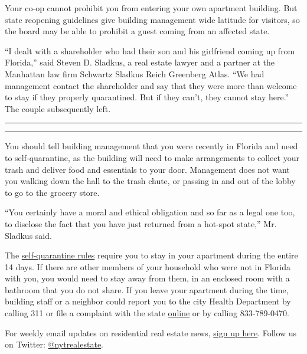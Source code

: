 Your co-op cannot prohibit you from entering your own apartment
building. But state reopening guidelines give building management wide
latitude for visitors, so the board may be able to prohibit a guest
coming from an affected state.

``I dealt with a shareholder who had their son and his girlfriend coming
up from Florida,'' said Steven D. Sladkus, a real estate lawyer and a
partner at the Manhattan law firm Schwartz Sladkus Reich Greenberg
Atlas. ``We had management contact the shareholder and say that they
were more than welcome to stay if they properly quarantined. But if they
can't, they cannot stay here.'' The couple subsequently left.

\begin{center}\rule{0.5\linewidth}{\linethickness}\end{center}

\begin{center}\rule{0.5\linewidth}{\linethickness}\end{center}

You should tell building management that you were recently in Florida
and need to self-quarantine, as the building will need to make
arrangements to collect your trash and deliver food and essentials to
your door. Management does not want you walking down the hall to the
trash chute, or passing in and out of the lobby to go to the grocery
store.

``You certainly have a moral and ethical obligation and so far as a
legal one too, to disclose the fact that you have just returned from a
hot-spot state,'' Mr. Sladkus said.

The
\href{https://coronavirus.health.ny.gov/system/files/documents/2020/07/nys-covid-travel-advisory-faq.pdf}{self-quarantine
rules} require you to stay in your apartment during the entire 14 days.
If there are other members of your household who were not in Florida
with you, you would need to stay away from them, in an enclosed room
with a bathroom that you do not share. If you leave your apartment
during the time, building staff or a neighbor could report you to the
city Health Department by calling 311 or file a complaint with the state
\href{https://mylicense.custhelp.com/app/ask}{online} or by calling
833-789-0470.

For weekly email updates on residential real estate news,
\href{http://www.nytimes3xbfgragh.onion/newsletters/realestate/}{sign up
here}. Follow us on Twitter:
\href{https://twitter.com/nytrealestate}{@nytrealestate}.

